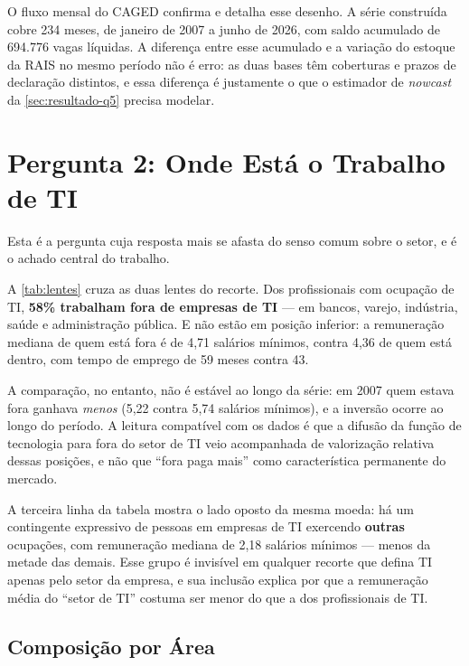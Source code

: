 O fluxo mensal do CAGED confirma e detalha esse desenho. A série construída cobre 234 meses, de janeiro de 2007 a junho de 2026, com saldo acumulado de 694.776 vagas líquidas. A diferença entre esse acumulado e a variação do estoque da RAIS no mesmo período não é erro: as duas bases têm coberturas e prazos de declaração distintos, e essa diferença é justamente o que o estimador de \textit{nowcast} da \autoref{sec:resultado-q5} precisa modelar.

\section{Pergunta 2: Onde Está o Trabalho de TI}
\label{sec:resultado-q2}

Esta é a pergunta cuja resposta mais se afasta do senso comum sobre o setor, e é o achado central do trabalho.



A \autoref{tab:lentes} cruza as duas lentes do recorte. Dos profissionais com ocupação de TI, \textbf{58\% trabalham fora de empresas de TI} --- em bancos, varejo, indústria, saúde e administração pública. E não estão em posição inferior: a remuneração mediana de quem está fora é de 4,71 salários mínimos, contra 4,36 de quem está dentro, com tempo de emprego de 59 meses contra 43.

A comparação, no entanto, não é estável ao longo da série: em 2007 quem estava fora ganhava \textit{menos} (5,22 contra 5,74 salários mínimos), e a inversão ocorre ao longo do período. A leitura compatível com os dados é que a difusão da função de tecnologia para fora do setor de TI veio acompanhada de valorização relativa dessas posições, e não que ``fora paga mais'' como característica permanente do mercado.

A terceira linha da tabela mostra o lado oposto da mesma moeda: há um contingente expressivo de pessoas em empresas de TI exercendo \textbf{outras} ocupações, com remuneração mediana de 2,18 salários mínimos --- menos da metade das demais. Esse grupo é invisível em qualquer recorte que defina TI apenas pelo setor da empresa, e sua inclusão explica por que a remuneração média do ``setor de TI'' costuma ser menor do que a dos profissionais de TI.

\subsection{Composição por Área}

